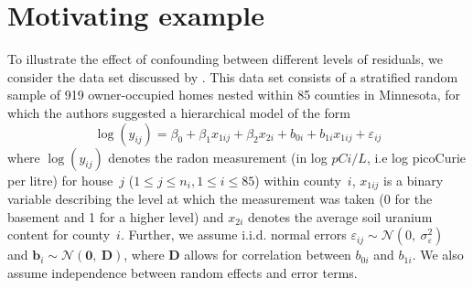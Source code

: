 \documentclass[12pt]{article} %
\newcommand{\al}[1]{{\color{red} #1}}
\begin{document}
\section{Motivating example}\label{sec:ex}
To illustrate the effect of confounding between different levels of residuals, we consider the data set discussed by
 \cite{Gelman:2006ue}. This data set consists of a stratified random sample of 919 owner-occupied homes nested within 85 counties in Minnesota, for which the authors suggested a hierarchical model of the form
%
\begin{equation}\label{eq:radon}
  \log(y_{ij}) = \beta_0 + \beta_1 x_{1ij} + \beta_2 x_{2i} + b_{0i} + b_{1i} x_{1ij}  + \varepsilon_{ij}
\end{equation}
%
where   $\log(y_{ij})$ denotes the  radon measurement (in log $pCi/L$, i.e log picoCurie per litre) for house~$j$ ($1 \le j \le n_i, 1 \le i \le 85$) within county~$i$,
 $x_{1ij}$ is a binary variable describing the level at which the measurement was taken (0 for the basement and 1 for a higher level) and $x_{2i}$ denotes the average soil uranium content for  county~$i$. 
 Further, we assume i.i.d. normal errors $\varepsilon_{ij} \sim \mathcal{N} (0,\ \sigma^2_{\varepsilon})$  and $\bm{b}_i \sim \mathcal{N}(\bm{0},\ \bm{D})$, where $\bm{D}$ allows for correlation between $b_{0i}$ and $b_{1i}$. We also assume independence between random effects and error \al{terms}. 
\end{document}
